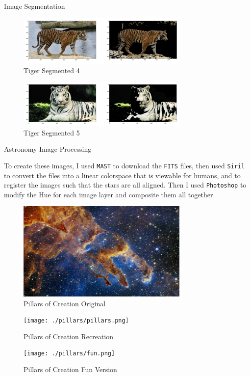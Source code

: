 \begin{hwkProblem}{3.4}{Image Segmentation}
	\begin{figure}[ht!]
	  \centering
	  \includegraphics[width=0.75\textwidth]{./tigers/3.4.4.png}
	  \caption{Tiger Segmented 4}
	\end{figure}

	\begin{figure}[ht!]
	  \centering
	  \includegraphics[width=0.75\textwidth]{./tigers/3.4.5.png}
	  \caption{Tiger Segmented 5}
	\end{figure}

\end{hwkProblem}

\begin{hwkProblem}{3.5}{Astronomy Image Processing}

	To create these images, I used \lstinline{MAST} to download the \lstinline{FITS} files, then used \lstinline{Siril} to convert the files into a linear colorspace that is viewable for humans, and to register the images such that the stars are all aligned. Then I used \lstinline{Photoshop} to modify the Hue for each image layer and composite them all together.
		
	\begin{figure}[ht!]
	  \centering
	  \includegraphics[width=0.75\textwidth]{./pillars/original.png}
	  \caption{Pillars of Creation Original}
	\end{figure}

	\begin{figure}[ht!]
	  \centering
	  \texttt{[image: ./pillars/pillars.png]}
	  \caption{Pillars of Creation Recreation}
	\end{figure}

	\begin{figure}[ht!]
	  \centering
	  \texttt{[image: ./pillars/fun.png]}
	  \caption{Pillars of Creation Fun Version}
	\end{figure}

\end{hwkProblem}


